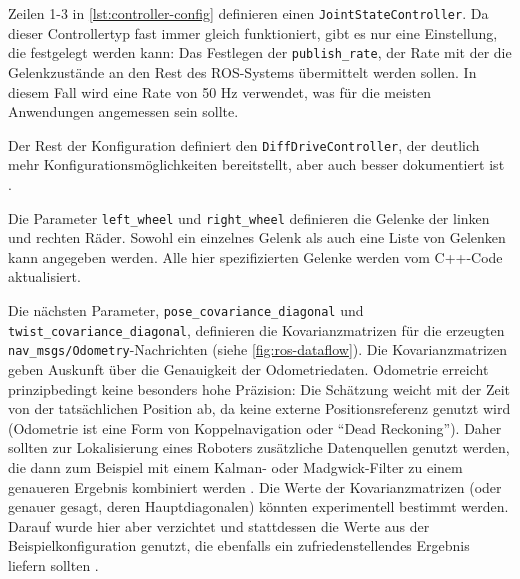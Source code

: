 \documentclass[german]{thesis_KBS}
\newcommand{\code}[1]{\texttt{#1}}  %
\begin{document}
Zeilen 1-3 in \autoref{lst:controller-config} definieren einen
\code{JointStateController}. Da dieser Controllertyp fast immer gleich
funktioniert, gibt es nur eine Einstellung, die festgelegt werden kann: Das
Festlegen der \code{publish\_rate}, der Rate mit der die Gelenkzustände an den
Rest des ROS-Systems übermittelt werden sollen. In diesem Fall wird eine Rate
von 50 Hz verwendet, was für die meisten Anwendungen angemessen sein sollte.

Der Rest der Konfiguration definiert den \code{DiffDriveController}, der
deutlich mehr Konfigurationsmöglichkeiten bereitstellt, aber auch besser
dokumentiert ist \cite{ros-diff-drive-controller}.

Die Parameter \code{left\_wheel} und \code{right\_wheel} definieren die Gelenke
der linken und rechten Räder. Sowohl ein einzelnes Gelenk als auch eine Liste
von Gelenken kann angegeben werden. Alle hier spezifizierten Gelenke werden vom
C++-Code aktualisiert.

Die nächsten Parameter, \code{pose\_covariance\_diagonal} und
\code{twist\_covariance\_diagonal}, definieren die Kovarianzmatrizen für die
erzeugten \code{nav\_msgs/Odometry}-Nachrichten (siehe
\autoref{fig:ros-dataflow}). Die Kovarianzmatrizen geben Auskunft über die
Genauigkeit der Odometriedaten. Odometrie erreicht prinzipbedingt keine
besonders hohe Präzision: Die Schätzung weicht mit der Zeit von der
tatsächlichen Position ab, da keine externe Positionsreferenz genutzt wird
(Odometrie ist eine Form von Koppelnavigation oder "`Dead Reckoning"'). Daher
sollten zur Lokalisierung eines Roboters zusätzliche Datenquellen genutzt
werden, die dann zum Beispiel mit einem Kalman- oder Madgwick-Filter zu einem
genaueren Ergebnis kombiniert werden \cite{madgwick}. Die Werte der
Kovarianzmatrizen (oder genauer gesagt, deren Hauptdiagonalen) könnten
experimentell bestimmt werden. Darauf wurde hier aber verzichtet und stattdessen
die Werte aus der Beispielkonfiguration genutzt, die ebenfalls ein
zufriedenstellendes Ergebnis liefern sollten \cite{ros-diff-drive-controller}.
\end{document}
